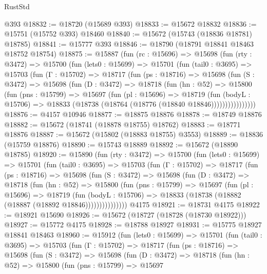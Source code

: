 \begin{lexlean}{RustStd}
\begin{coremodule}
    @393
@18832 := @18720 (@15689 @393)
@18833 := @15672 @18832
@18836 := @15751 (@15752 @393) @18460
@18840 := @15672 (@15743 (@18836 @18781) @18785)
@18841 := @15777 @393
@18846 := @18790 (@18791 @18841 @18463 @18752 @18754)
@18875 := @15887
    (fun (rc : @15696) =>
    @15698
      (fun (rty : @3472) =>
      @15700
        (fun (lets0 : @15699) =>
        @15701
          (fun (tail0 : @3695) =>
          @15703
            (fun (Γ : @15702) =>
            @18717
              (fun (ps : @18716) =>
              @15698
                (fun (S : @3472) =>
                @15698
                  (fun (D : @3472) =>
                  @18718
                    (fun (hn : @52) =>
                    @15800
                      (fun (pns : @15799) =>
                      @15697
                        (fun (pl : @15696) =>
                        @18719
                          (fun (bodyL : @15706) =>
                          @18833 (@18738 (@18764 (@18776 (@18840 @18846))))))))))))))))
@18876 := @4157 @10946
@18877 := @18875 @18876
@18878 := @18749 @18876
@18882 := @15672 (@18741 (@18878 @18755) @18762)
@18883 := @18771 @18876
@18887 := @15672 (@15802 (@18883 @18755) @3553)
@18889 := @18836 (@15759 @18876)
@18890 := @15743 @18889
@18892 := @15672 (@18890 @18785)
@18920 := @15890
    (fun (rty : @3472) =>
    @15700
      (fun (lets0 : @15699) =>
      @15701
        (fun (tail0 : @3695) =>
        @15703
          (fun (Γ : @15702) =>
          @18717
            (fun (ps : @18716) =>
            @15698
              (fun (S : @3472) =>
              @15698
                (fun (D : @3472) =>
                @18718
                  (fun (hn : @52) =>
                  @15800
                    (fun (pns : @15799) =>
                    @15697
                      (fun (pl : @15696) =>
                      @18719
                        (fun (bodyL : @15706) =>
                        @18833 (@18738 (@18882 (@18887 (@18892 @18846)))))))))))))))
    @4175
@18921 := @18731 @4175
@18922 := @18921 @15690
@18926 := @15672 (@18727 (@18728 (@18730 @18922)))
@18927 := @15772 @4175
@18928 := @18788 @18927
@18931 := @15775 @18927 @18841 @18463
@18960 := @15912
    (fun (lets0 : @15699) =>
    @15701
      (fun (tail0 : @3695) =>
      @15703
        (fun (Γ : @15702) =>
        @18717
          (fun (ps : @18716) =>
          @15698
            (fun (S : @3472) =>
            @15698
              (fun (D : @3472) =>
              @18718
                (fun (hn : @52) =>
                @15800
                  (fun (pns : @15799) =>
                  @15697

\end{coremodule}
\end{lexlean}
